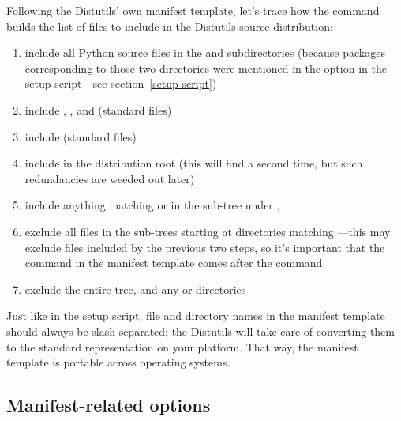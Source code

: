 \documentclass{howto}
\begin{document}
Following the Distutils' own manifest template, let's trace how the
 command builds the list of files to include in the
Distutils source distribution:
\begin{enumerate}
\item include all Python source files in the  and
   subdirectories (because packages
  corresponding to those two directories were mentioned in the
   option in the setup script---see
  section~\ref{setup-script})
\item include , , and 
  (standard files)
\item include  (standard files)
\item include  in the distribution root (this will find
   a second time, but such redundancies are weeded out
  later)
\item include anything matching  or  in the
  sub-tree under ,
\item exclude all files in the sub-trees starting at directories
  matching ---this may exclude files
  included by the previous two steps, so it's important that the
   command in the manifest template comes after the
   command
\item exclude the entire  tree, and any  or
   directories
\end{enumerate}
Just like in the setup script, file and directory names in the manifest
template should always be slash-separated; the Distutils will take care
of converting them to the standard representation on your platform.
That way, the manifest template is portable across operating systems.


\subsection{Manifest-related options}
\label{manifest-options}
\end{document}
